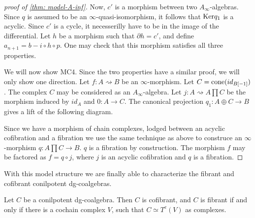 \documentclass[../thesis.tex]{subfiles}
\begin{document}
\begin{proof}[proof of \ref{thm: model-A-inf}]
            Now, $c'$ is a morphism between two $A_\infty$-algebras. Since $q$ is assumed to be an $\infty$-quasi-isomorphism, it follows that $\tt{Ker}q_1$ is a acyclic. Since $c'$ is a cycle, it necesserilly have to be in the image of the differential. Let $h$ be a morphism such that $\partial h = c'$, and define $a_{n+1} = b - i\circ h\circ p$. One may check that this morphism satisfies all three properties.

            We will now show MC4. Since the two properties have a similar proof, we will only show one direction. Let $f: A \rightsquigarrow B$ be an $\infty$-morphism. Let $C = \tt{cone}(id_{B[-1]})$. The complex $C$ may be considered as an $A_\infty$-algebra. Let $j : A \rightsquigarrow A\prod C$ be the morphism induced by $id_A$ and $0:A \rightarrow C$. The canonical projection $q_1 : A\oplus C \rightarrow B$ gives a lift of the following diagram.

            \begin{center}
            \end{center}

            Since we have a morphism of chain complexes, lodged between an acyclic cofibration and a fibration we use the same technique as above to construce an $\infty$-morphism $q : A\prod C \rightarrow B$. $q$ is a fibration by construction. The morphism $f$ may be factored as $f = q\circ j$, where $j$ is an acyclic cofibration and $q$ is a fibration.
        \end{proof}

        With this model structure we are finally able to characterize the fibrant and cofibrant conilpotent dg-coalgebras.

        \begin{proposition}
            Let $C$ be a conilpotent dg-coalgebra. Then $C$ is cofibrant, and $C$ is fibrant if and only if there is a cochain complex $V$, such that $C \simeq T^c(V)$ as complexes.
        \end{proposition}
\end{document}
